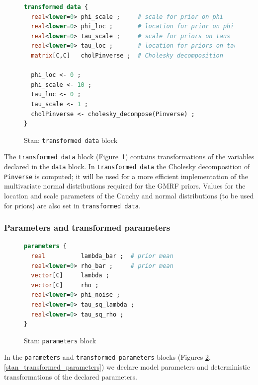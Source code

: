 \begin{figure}[h]
\begin{lstlisting}[language=Stan, frame=trBL]
transformed data {
  real<lower=0> phi_scale ;     # scale for prior on phi
  real<lower=0> phi_loc ;       # location for prior on phi
  real<lower=0> tau_scale ;     # scale for priors on taus
  real<lower=0> tau_loc ;       # location for priors on taus
  matrix[C,C]   cholPinverse ;  # Cholesky decomposition 
  
  phi_loc <- 0 ;
  phi_scale <- 10 ;
  tau_loc <- 0 ;
  tau_scale <- 1 ;
  cholPinverse <- cholesky_decompose(Pinverse) ;
}
\end{lstlisting}
\caption{Stan: {\tt transformed data} block}
\label{stan_transformed_data}
\end{figure}


The {\tt transformed data} block (Figure~\ref{stan_transformed_data}) contains transformations of the variables declared in the {\tt data} block. In {\tt transformed data} the Cholesky decomposition of {\tt Pinverse} is computed; it will be used for a more efficient implementation of the multivariate normal distributions required for the GMRF priors. Values for the location and scale parameters of the Cauchy and normal distributions (to be used for priors) are also set in {\tt transformed data}. 






\subsubsection{Parameters and transformed parameters}

\begin{figure}[h]
\begin{lstlisting}[language=Stan, frame=trBL]
parameters {
  real          lambda_bar ;  # prior mean 
  real<lower=0> rho_bar ;     # prior mean 
  vector[C]     lambda ;      
  vector[C]     rho ;
  real<lower=0> phi_noise ;    
  real<lower=0> tau_sq_lambda ;  
  real<lower=0> tau_sq_rho ;
}
\end{lstlisting}
\caption{Stan: {\tt parameters} block}
\label{stan_parameters}
\end{figure}

In the {\tt parameters} and {\tt transformed parameters} blocks (Figures \ref{stan_parameters}, \ref{stan_transformed_parameters}) we declare model parameters and deterministic transformations of the declared parameters. 



